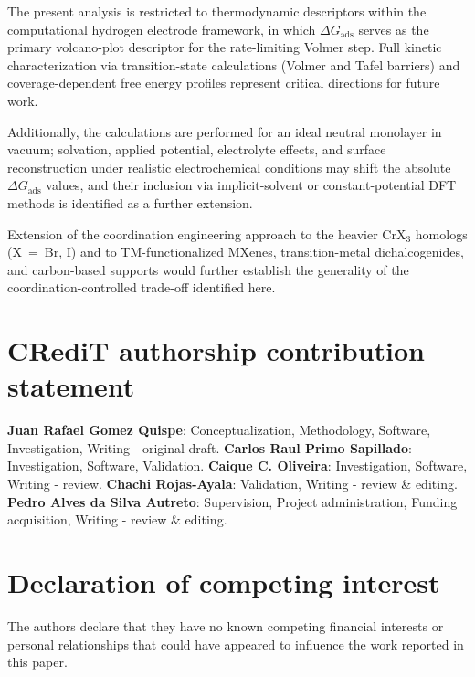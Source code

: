\documentclass[journal=jacsat,manuscript=article]{achemso}
\begin{document}
{\color{revcolor}%
  The present analysis is restricted to thermodynamic descriptors within the computational hydrogen electrode framework, in which $\Delta G_{\mathrm{ads}}$ serves as the primary volcano-plot descriptor for the rate-limiting Volmer step. Full kinetic characterization via transition-state calculations (Volmer and Tafel barriers) and coverage-dependent free energy profiles represent critical directions for future work.
\par}

{\color{revcolor}%
  Additionally, the calculations are performed for an ideal neutral monolayer in vacuum; solvation, applied potential, electrolyte effects, and surface reconstruction under realistic electrochemical conditions may shift the absolute $\Delta G_{\mathrm{ads}}$ values, and their inclusion via implicit-solvent or constant-potential DFT methods is identified as a further extension.
\par}

{\color{revcolor}%
  Extension of the coordination engineering approach to the heavier CrX$_3$ homologs (X~=~Br, I) and to TM-functionalized MXenes, transition-metal dichalcogenides, and carbon-based supports would further establish the generality of the coordination-controlled trade-off identified here.
\par}

\section*{CRediT authorship contribution statement}
\begin{sloppypar}
  \textbf{Juan Rafael Gomez Quispe}: Conceptualization, Methodology, Software, Investigation, Writing - original draft. \textbf{Carlos Raul Primo Sapillado}: Investigation, Software, Validation. \textbf{Caique C. Oliveira}: Investigation, Software, Writing - review. \textbf{Chachi Rojas-Ayala}: Validation, Writing - review \& editing. \textbf{Pedro Alves da Silva Autreto}: Supervision, Project administration, Funding acquisition, Writing - review \& editing.
\end{sloppypar}

\section*{Declaration of competing interest}
The authors declare that they have no known competing financial interests or personal relationships that could have appeared to influence the work reported in this paper.
\end{document}
